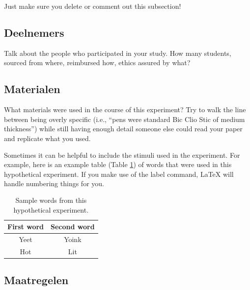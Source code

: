 \documentclass[stu,12pt,floatsintext]{apa7}
\begin{document}
Just make sure you delete or comment out this subsection!

\subsection{Deelnemers}

Talk about the people who participated in your study. How many students, sourced from where, reimbursed how, ethics assured by what?

\subsection{Materialen}

What materials were used in the course of this experiment? Try to walk the line between being overly specific (i.e., ``pens were standard Bic Clio Stic of medium thickness'') while still having enough detail someone else could read your paper and replicate what you used.

Sometimes it can be helpful to include the stimuli used in the experiment. For example, here is an example table (Table \ref{tab:table_words}) of words that were used in this hypothetical experiment. If you make use of the label command, \LaTeX{} will handle numbering things for you.

\begin{table}
    \caption{Sample words from this hypothetical experiment.}
    \centering
    \begin{tabular}{cc} %
        \hline 
         First word & Second word \\
         \hline
         Yeet & Yoink \\
         Hot & Lit \\
         \hline
    \end{tabular}
    \label{tab:table_words}
\end{table}


\subsection{Maatregelen}
\end{document}
